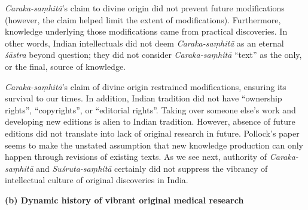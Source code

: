 {\sl Caraka-saṃhitā}'s claim to divine origin did not prevent future modifications (however, the claim helped limit the extent of modifications).  Furthermore, knowledge underlying those modifications came from practical discoveries.  In other words, Indian intellectuals did not deem {\sl Caraka-saṃhitā} as an eternal {\sl śāstra} beyond question; they did not consider {\sl Caraka-saṃhitā} ``text'' as the only, or the final, source of knowledge.

{\sl Caraka-saṃhitā}'s claim of divine origin restrained modifications, ensuring its survival to our times. In addition, Indian tradition did not have ``ownership rights'', ``copyrights'', or ``editorial rights''.  Taking over someone else's work and developing new editions is alien to Indian tradition.  However, absence of future editions did not translate into lack of original research in future.  Pollock's paper seems to make the unstated assumption that new knowledge production can only happen through revisions of existing texts. As we see next, authority of {\sl Caraka-saṃhitā} and {\sl Suśruta-saṃhitā} certainly did not suppress the vibrancy of intellectual culture of original discoveries in India.

{\bf (b) Dynamic history of vibrant original medical research}

